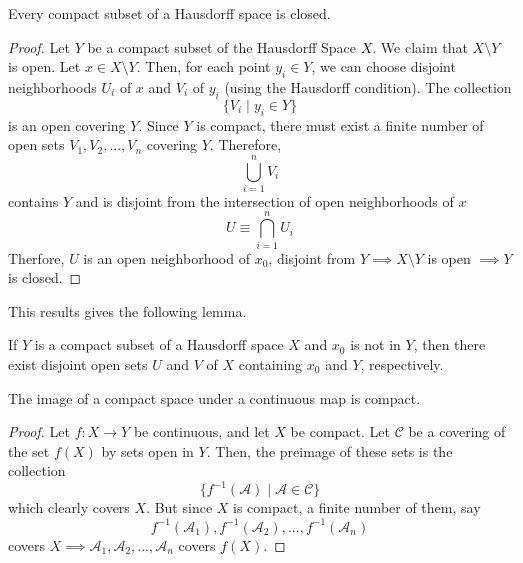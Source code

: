 \documentclass{article}
\begin{document}
    \begin{theorem}
    Every compact subset of a Hausdorff space is closed. 
    \end{theorem}
    \begin{proof}
    Let $Y$ be a compact subset of the Hausdorff Space $X$. We claim that $X \setminus Y$ is open. Let $x \in X \setminus Y$. Then, for each point $y_i \in Y$, we can choose disjoint neighborhoods $U_i$ of $x$ and $V_i$ of $y_i$ (using the Hausdorff condition). The collection 
    \[\{V_i \; | \; y_i \in Y\}\]
    is an open covering $Y$. Since $Y$ is compact, there must exist a finite number of open sets $V_1, V_2, ..., V_n$ covering $Y$. Therefore, 
    \[\bigcup_{i=1}^n V_i\]
    contains $Y$ and is disjoint from the intersection of open neighborhoods of $x$
    \[U \equiv \bigcap_{i=1}^n U_i\]
    Therfore, $U$ is an open neighborhood of $x_0$, disjoint from $Y \implies X \setminus Y$ is open $\implies Y$ is closed.
    \end{proof}

    This results gives the following lemma. 

    \begin{lemma}
    If $Y$ is a compact subset of a Hausdorff space $X$ and $x_0$ is not in $Y$, then there exist disjoint open sets $U$ and $V$ of $X$ containing $x_0$ and $Y$, respectively. 
    \end{lemma}

    \begin{center}
    \end{center}

    \begin{theorem}
    The image of a compact space under a continuous map is compact.
    \end{theorem}
    \begin{proof}
    Let $f: X \longrightarrow Y$ be continuous, and let $X$ be compact. Let $\mathcal{C}$ be a covering of the set $f(X)$ by sets open in $Y$. Then, the preimage of these sets is the collection
    \[\{f^{-1}(\mathcal{A}) \; | \; \mathcal{A} \in \mathcal{C}\}\]
    which clearly covers $X$. But since $X$ is compact, a finite number of them, say
    \[f^{-1} (\mathcal{A}_1), f^{-1} (\mathcal{A}_2), ..., f^{-1} (\mathcal{A}_n)\]
    covers $X \implies \mathcal{A}_1, \mathcal{A}_2, ..., \mathcal{A}_n$ covers $f(X)$. 
    \end{proof}
\end{document}
